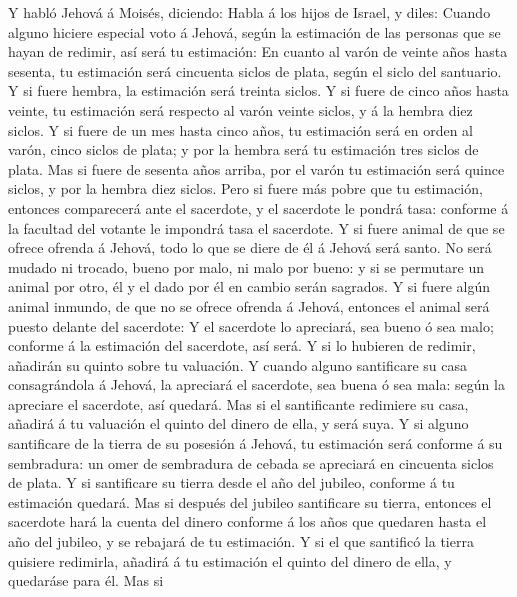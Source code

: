  Y habló Jehová á Moisés, diciendo:  Habla á
los hijos de Israel, y diles: Cuando alguno hiciere especial voto á
Jehová, según la estimación de las personas que se hayan de redimir, así
será tu estimación:  En cuanto al varón de veinte años
hasta sesenta, tu estimación será cincuenta siclos de plata, según el
siclo del santuario.  Y si fuere hembra, la estimación
será treinta siclos.  Y si fuere de cinco años hasta
veinte, tu estimación será respecto al varón veinte siclos, y á la
hembra diez siclos.  Y si fuere de un mes hasta cinco
años, tu estimación será en orden al varón, cinco siclos de plata; y por
la hembra será tu estimación tres siclos de plata.  Mas si
fuere de sesenta años arriba, por el varón tu estimación será quince
siclos, y por la hembra diez siclos.  Pero si fuere más
pobre que tu estimación, entonces comparecerá ante el sacerdote, y el
sacerdote le pondrá tasa: conforme á la facultad del votante le impondrá
tasa el sacerdote.  Y si fuere animal de que se ofrece
ofrenda á Jehová, todo lo que se diere de él á Jehová será santo.
 No será mudado ni trocado, bueno por malo, ni malo por
bueno: y si se permutare un animal por otro, él y el dado por él en
cambio serán sagrados.  Y si fuere algún animal inmundo,
de que no se ofrece ofrenda á Jehová, entonces el animal será puesto
delante del sacerdote:  Y el sacerdote lo apreciará, sea
bueno ó sea malo; conforme á la estimación del sacerdote, así será.
 Y si lo hubieren de redimir, añadirán su quinto sobre tu
valuación.  Y cuando alguno santificare su casa
consagrándola á Jehová, la apreciará el sacerdote, sea buena ó sea mala:
según la apreciare el sacerdote, así quedará.  Mas si el
santificante redimiere su casa, añadirá á tu valuación el quinto del
dinero de ella, y será suya.  Y si alguno santificare de
la tierra de su posesión á Jehová, tu estimación será conforme á su
sembradura: un omer de sembradura de cebada se apreciará en cincuenta
siclos de plata.  Y si santificare su tierra desde el año
del jubileo, conforme á tu estimación quedará.  Mas si
después del jubileo santificare su tierra, entonces el sacerdote hará la
cuenta del dinero conforme á los años que quedaren hasta el año del
jubileo, y se rebajará de tu estimación.  Y si el que
santificó la tierra quisiere redimirla, añadirá á tu estimación el
quinto del dinero de ella, y quedaráse para él.  Mas si
